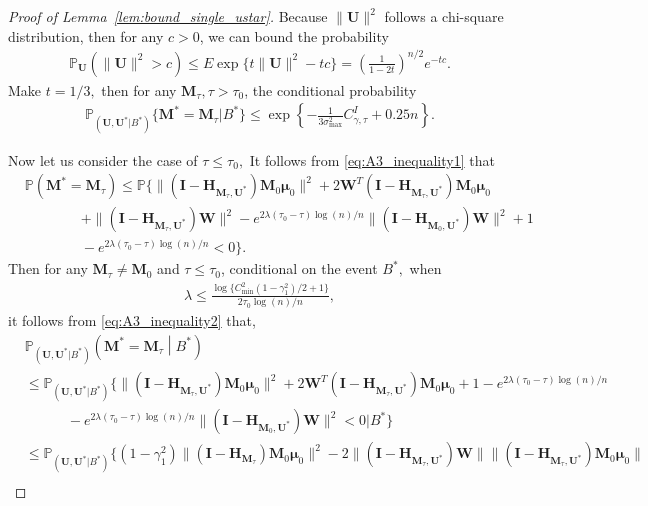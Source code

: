 \documentclass[12pt]{article}
\theoremstyle{shortspace}
\def\*#1{\bm{#1}}
\def\P{\mathbb P}
\begin{document}
\begin{proof}[Proof of Lemma~\ref{lem:bound_single_ustar}]
 
 
Because $\|\*U\|^2$ follows a  chi-square distribution, then for any $c>0$, we can bound the probability
\begin{align}
\label{eq:markov_ineuqality}
      \P_{\*U}(\|\*U\|^2 > c)  \leq E \exp\{t\|\*U\|^2 -tc\} 
    = \left(\frac{1}{1-2t}\right)^{n/2}e^{-tc}.
\end{align}
Make $t = 1/3,$ then for any $\*M_\tau, \tau > \tau_0$, the conditional probability
\begin{align}
\label{eq:bound_tau_large}
      \P_{(\*U, \*U^*|B^*)}\bigg\{{\*M}^* = \*M_\tau \bigg | B^* \bigg\} \leq \exp\left\{-\frac{1}{3\sigma^2_{\max}} C^I_{\gamma, \tau} + 0.25n \right\}.
\end{align}


Now let us consider the case of $\tau \leq \tau_0,$  
 It follows from \eqref{eq:A3_inequality1} that
\begin{align}
\label{eq:A3_inequality2}
    &   \P({\*M}^*  = \*M_\tau)
    \leq  \P\big\{ \|(\*I-\*H_{\*M_{\tau}, \*U^*})\*M_0 \*\mu_0\|^2 +  2 \*W^T (\*I-\*H_{\*M_{\tau}, \*U^*})\*M_0 \*\mu_0  \nonumber \\
    & \qquad\qquad + \|(\*I-\*H_{\*M_{\tau}, \*U^*})\*W\|^2 - e^{2\lambda(\tau_0-\tau)\log(n)/n} \|(\*I-\*H_{\*M_0, \*U^*})\*W\|^2 +1 \\
    & \qquad\qquad -e^{2\lambda(\tau_0-\tau)\log(n)/n} < 0\big\}. \nonumber
\end{align}
Then for any $\*M_\tau \neq \*M_0$ and $ \tau \leq \tau_0$,  
conditional on the event $B^*,$ when 
\begin{align}
\label{eq:lambda_upper}
    \lambda \leq \frac{\log\{C^2_{\min}(1- \gamma^2_1)/2 + 1\}}{2 \tau_0 \log(n)/n},
\end{align}
it follows from  
\eqref{eq:A3_inequality2} that,     
\begin{align*}
    &   \P_{(\*U, \*U^*|B^*)}\left({\*M}^*  = \*M_\tau \middle| B^*\right) \\
    & \leq \P_{(\*U, \*U^*|B^*)}\bigg\{\|(\*I-\*H_{\*M_\tau, \*U^*})\*M_0 \*\mu_0\|^2  + 2 \*W^T (\*I-\*H_{\*M_\tau, \*U^*})\*M_0 \*\mu_0 +1 -e^{2\lambda(\tau_0-\tau)\log(n)/n}  \\
    &   \quad  \quad \quad   - e^{2\lambda(\tau_0-\tau)\log(n)/n} \|(\*I-\*H_{\*M_0, \*U^*})\*W\|^2  < 0   \bigg |  B^*\bigg\}\\
     & \leq \P_{(\*U, \*U^*|B^*)}\bigg\{(1 - \gamma^2_1)\|(\*I-\*H_{\*M_\tau})\*M_0 \*\mu_0\|^2  - 2 \|(\*I-\*H_{\*M_\tau, \*U^*})\*W\| \|(\*I-\*H_{\*M_\tau, \*U^*})\*M_0 \*\mu_0\|  \\ 

\end{align*}
\end{proof}
\end{document}
